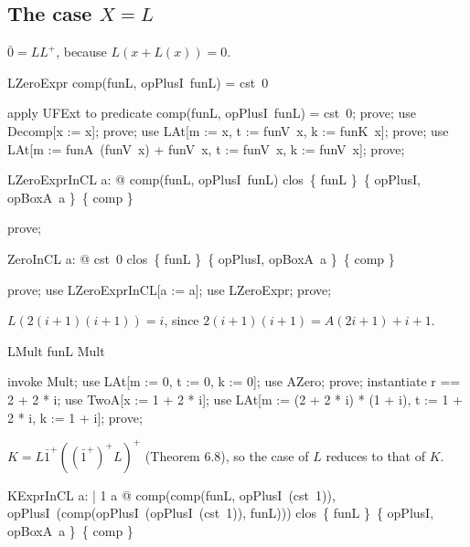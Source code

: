 \documentclass{article}
\begin{document}
\subsection{The case $X = L$}

$\bar 0 = L L^+$, because $L(x + L(x)) = 0$.

\begin{theorem}{LZeroExpr}
  comp(funL, opPlusI~funL) = cst~0
\end{theorem}

\begin{zproof}
apply UFExt to predicate comp(funL, opPlusI~funL) = cst~0;
prove;
use Decomp[x := x];
prove;
use LAt[m := x, t := funV~x, k := funK~x];
prove;
use LAt[m := funA~(funV~x) + funV~x, t := funV~x, k := funV~x];
prove;
\end{zproof}

\begin{theorem}{LZeroExprInCL}
  \forall a: \nat @ comp(funL, opPlusI~funL) \in clos~\{ funL \}~\{ opPlusI, opBoxA~a \}~\{ comp \}
\end{theorem}

\begin{zproof}
prove;
\end{zproof}

\begin{theorem}{ZeroInCL}
  \forall a: \nat @ cst~0 \in clos~\{ funL \}~\{ opPlusI, opBoxA~a \}~\{ comp \}
\end{theorem}

\begin{zproof}
prove;
use LZeroExprInCL[a := a];
use LZeroExpr;
prove;
\end{zproof}

$L(2(i+1)(i+1)) = i$, since $2(i+1)(i+1) = A(2i+1) + i + 1$.

\begin{theorem}{LMult}
  funL \in Mult
\end{theorem}

\begin{zproof}
invoke Mult;
use LAt[m := 0, t := 0, k := 0];
use AZero;
prove;
instantiate r == 2 + 2 * i;
use TwoA[x := 1 + 2 * i];
use LAt[m := (2 + 2 * i) * (1 + i), t := 1 + 2 * i, k := 1 + i];
prove;
\end{zproof}

$K = L \bar 1^+ ((\bar 1^+)^+ L)^+$ (Theorem 6.8), so the case of $L$ reduces to that of $K$.

\begin{theorem}{KExprInCL}
  \forall a: \nat | 1 \leq a @ comp(comp(funL, opPlusI~(cst~1)), opPlusI~(comp(opPlusI~(opPlusI~(cst~1)), funL))) \in clos~\{ funL \}~\{ opPlusI, opBoxA~a \}~\{ comp \}
\end{theorem}
\end{document}
